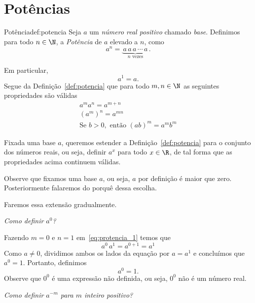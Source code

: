 \section{Potências}

\begin{definicao}{Potência}{def:potencia}
  Seja $a$ um \emph{número real positivo} chamado \emph{base}.
  Definimos para todo $n\in\N$, a \emph{Potência}
  de $a$ elevado a $n$, como
  \[
    a^n = \underbrace{\,a\,a\,a\,\cdots\, a\,}_{n\text{ vezes}}.
  \]
\end{definicao}

Em particular,
\[
  a^1 = a.
\]
Segue da Definição~\ref{def:potencia} que para todo
$m, n\in\N$ as seguintes propriedades são válidas
\begin{gather}
  a^m a^n = a^{m+n}                               \label{eq:protencia_1}  \\[2mm]
  \left(a^m\right)^n = a^{mn}                     \label{eq:protencia_2}  \\[2mm]
  \text{Se } b>0, \text{ então } (ab)^m = a^m b^m \label{eq:protencia_3}
\end{gather}

Fixada uma base $a$, queremos estender a Definição~\ref{def:potencia} para o
conjunto dos números reais, ou seja, definir $a^x$ para todo $x\in\R$, de tal
forma que as propriedades acima continuem válidas.

Observe que fixamos uma base $a$, ou seja, $a$ por definição é maior que zero.
Posteriormente falaremos do porquê dessa escolha.

Faremos essa extensão gradualmente.

\emph{Como definir $a^0$?}

Fazendo $m=0$ e $n=1$ em~\eqref{eq:protencia_1} temos que
\[
  a^0 \, a^1 = a^{0+1} = a^1
\]
Como $a\neq 0$, dividimos ambos os lados da equação por $a=a^1$ e
concluímos que $a^0=1$. Portanto, definimos
\begin{equation}
  \label{eq:potencia_zero}
  a^0 = 1.
\end{equation}
Observe que $0^0$ é uma expressão não definida, ou seja, $0^0$ não é um
número real.

\emph{Como definir $a^{-m}$ para $m$ inteiro positivo?}


